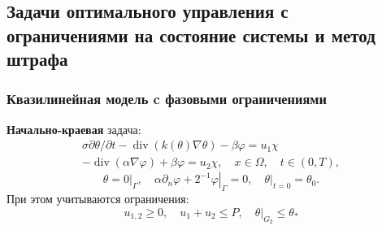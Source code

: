 \subsection{Задачи оптимального управления с ограничениями на состояние системы и метод штрафа}\label{subsec:opt-phase}
\begin{frame}
    \frametitle{Квазилинейная модель c фазовыми ограничениями}
    \textbf{Начально-краевая} задача:
    \begin{equation}
        \label{eq:3_2:1}
        \begin{gathered}
            \sigma \partial \theta / \partial t-\operatorname{div}(k(\theta)
            \nabla \theta)-\beta \varphi=u_{1} \chi \\
            -\operatorname{div}(\alpha \nabla \varphi)+\beta \varphi=u_{2}
            \chi, \quad x \in \Omega, \quad t \in(0, T),
        \end{gathered}
    \end{equation}
    \begin{equation}
        \label{eq:3_2:2}
        \theta=\left.0\right|_{\Gamma},
        \quad \alpha \partial_{n} \varphi
        +\left.2^{-1} \varphi\right|_{\Gamma}=0,
        \left.\quad \theta\right|_{t=0}=\theta_{0}.
    \end{equation}
    При этом учитываются ограничения:
    \[ u_{1,2} \geq 0, \quad u_{1}+u_{2} \leq P, \left.\quad \theta\right|_{G_{2}} \leq \theta_{*} \]


\end{frame}

